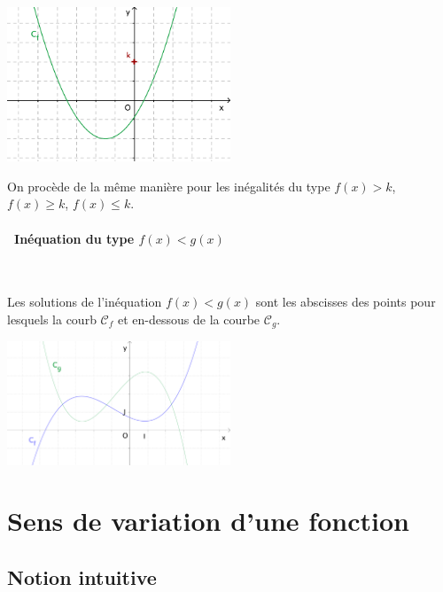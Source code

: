 \medskip

{\centering
\includegraphics[width=0.5\textwidth]{F_resineq_f.pdf}
\par}

\medskip

On procède de la même manière pour les inégalités du type $f(x)>k$,
$f(x)\geq k$, $f(x)\leq k$. 

\paragraph{\textbullet \ Inéquation du type $f(x)<g(x)$} \ \par
Les solutions de l'inéquation $f(x)<g(x)$ sont les abscisses des
points pour lesquels la courb $\mathscr{C}_f$ et en-dessous de la
courbe $\mathscr{C}_g$.

\medskip

{\centering
  \includegraphics[width=0.5\textwidth]{F_resineq_fg.pdf}
\par}



\section{Sens de variation d'une fonction}
\label{sec:variations}

\subsection{Notion intuitive}
\label{ssec:notion_intuitive}

\vspace{2cm}


